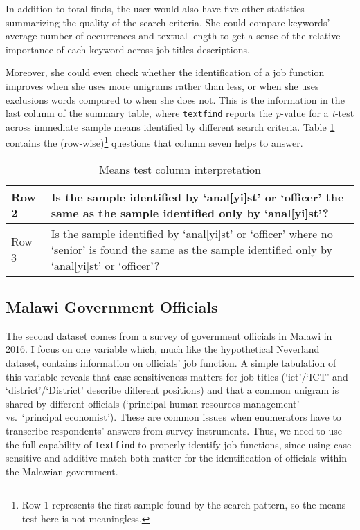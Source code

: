 In addition to total finds, the user would also have five other statistics summarizing the quality of the search criteria. She could compare keywords' average number of occurrences and textual length to get a sense of the relative importance of each keyword across job titles descriptions.

Moreover, she could even check whether the identification of a job function improves when she uses more unigrams rather than less, or when she uses exclusions words compared to when she does not. This is the information in the last column of the summary table, where {\tt textfind} reports the {\it p}-value for a {\it t}-test across immediate sample means identified by different search criteria. Table \ref{tab:1} contains the (row-wise)\footnote{Row 1 represents the first sample found by the search pattern, so the means test here is not meaningless.} questions that column seven helps to answer.

\begin{table}[!htbp]
  \caption{Means test column interpretation}\label{tab:1}
  \centering
  \small
  \begin{tabular}{|l|p{11cm}|}
  \hline
  Row 2 & Is the sample identified by `anal[yi]st' or `officer' the same as the sample identified only by `anal[yi]st'? \\
  \hline
  Row 3 & Is the sample identified by `anal[yi]st' or `officer' where no `senior' is found the same as the sample identified only by `anal[yi]st' or `officer'? \\
  \hline
  \end{tabular}
\end{table}

\subsection{Malawi Government Officials}
The second dataset comes from a survey of government officials in Malawi in 2016. I focus on one variable which, much like the hypothetical Neverland dataset, contains information on officials' job function. A simple tabulation of this variable reveals that case-sensitiveness matters for job titles (`ict'/`ICT' and `district'/`District' describe different positions) and that a common unigram is shared by different officials (`principal human resources management' vs.~`principal economist'). These are common issues when enumerators have to transcribe respondents' answers from survey instruments. Thus, we need to use the full capability of {\tt textfind} to properly identify job functions, since using case-sensitive and additive match both matter for the identification of officials within the Malawian government.

